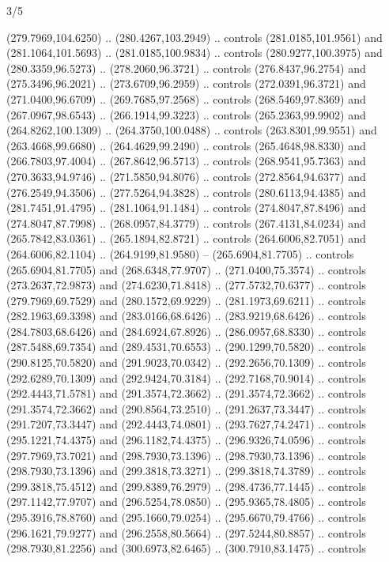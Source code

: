 \begin{flagdescription}{3/5}
\begin{scope}[xshift=0.5\flaglength,yshift=0.5\flagwidth,scale=\flagwidth/270]
\begin{scope}[y=0.8pt, x=0.8pt, yscale=-1,shift={(-281.25,-168.75)}]
  (279.7969,104.6250) .. (280.4267,103.2949) .. controls (281.0185,101.9561) and
  (281.1064,101.5693) .. (281.0185,100.9834) .. controls (280.9277,100.3975) and
  (280.3359,96.5273) .. (278.2060,96.3721) .. controls (276.8437,96.2754) and
  (275.3496,96.2021) .. (273.6709,96.2959) .. controls (272.0391,96.3721) and
  (271.0400,96.6709) .. (269.7685,97.2568) .. controls (268.5469,97.8369) and
  (267.0967,98.6543) .. (266.1914,99.3223) .. controls (265.2363,99.9902) and
  (264.8262,100.1309) .. (264.3750,100.0488) .. controls (263.8301,99.9551) and
  (263.4668,99.6680) .. (264.4629,99.2490) .. controls (265.4648,98.8330) and
  (266.7803,97.4004) .. (267.8642,96.5713) .. controls (268.9541,95.7363) and
  (270.3633,94.9746) .. (271.5850,94.8076) .. controls (272.8564,94.6377) and
  (276.2549,94.3506) .. (277.5264,94.3828) .. controls (280.6113,94.4385) and
  (281.7451,91.4795) .. (281.1064,91.1484) .. controls (274.8047,87.8496) and
  (274.8047,87.7998) .. (268.0957,84.3779) .. controls (267.4131,84.0234) and
  (265.7842,83.0361) .. (265.1894,82.8721) .. controls (264.6006,82.7051) and
  (264.6006,82.1104) .. (264.9199,81.9580) -- (265.6904,81.7705) .. controls
  (265.6904,81.7705) and (268.6348,77.9707) .. (271.0400,75.3574) .. controls
  (273.2637,72.9873) and (274.6230,71.8418) .. (277.5732,70.6377) .. controls
  (279.7969,69.7529) and (280.1572,69.9229) .. (281.1973,69.6211) .. controls
  (282.1963,69.3398) and (283.0166,68.6426) .. (283.9219,68.6426) .. controls
  (284.7803,68.6426) and (284.6924,67.8926) .. (286.0957,68.8330) .. controls
  (287.5488,69.7354) and (289.4531,70.6553) .. (290.1299,70.5820) .. controls
  (290.8125,70.5820) and (291.9023,70.0342) .. (292.2656,70.1309) .. controls
  (292.6289,70.1309) and (292.9424,70.3184) .. (292.7168,70.9014) .. controls
  (292.4443,71.5781) and (291.3574,72.3662) .. (291.3574,72.3662) .. controls
  (291.3574,72.3662) and (290.8564,73.2510) .. (291.2637,73.3447) .. controls
  (291.7207,73.3447) and (292.4443,74.0801) .. (293.7627,74.2471) .. controls
  (295.1221,74.4375) and (296.1182,74.4375) .. (296.9326,74.0596) .. controls
  (297.7969,73.7021) and (298.7930,73.1396) .. (298.7930,73.1396) .. controls
  (298.7930,73.1396) and (299.3818,73.3271) .. (299.3818,74.3789) .. controls
  (299.3818,75.4512) and (299.8389,76.2979) .. (298.4736,77.1445) .. controls
  (297.1142,77.9707) and (296.5254,78.0850) .. (295.9365,78.4805) .. controls
  (295.3916,78.8760) and (295.1660,79.0254) .. (295.6670,79.4766) .. controls
  (296.1621,79.9277) and (296.2558,80.5664) .. (297.5244,80.8857) .. controls
  (298.7930,81.2256) and (300.6973,82.6465) .. (300.7910,83.1475) .. controls

\end{scope}
\end{scope}
\end{flagdescription}
